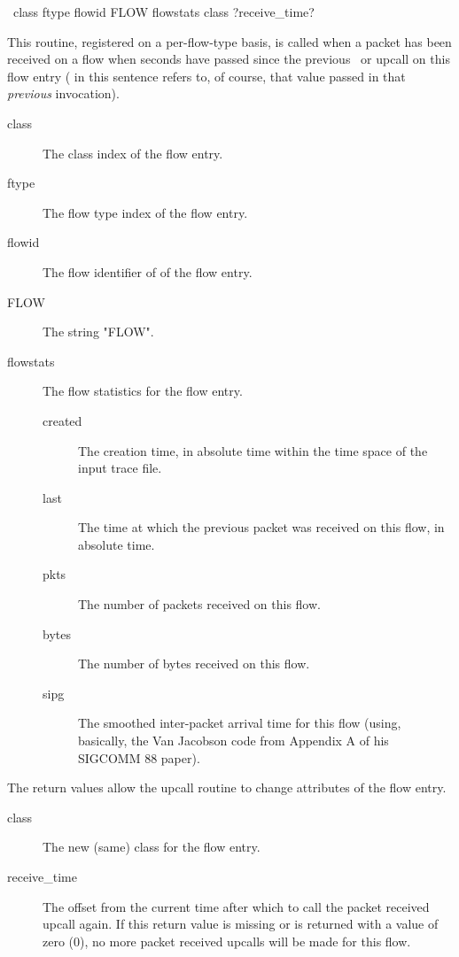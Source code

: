 \documentclass{article}
\begin{document}
\manend


\SYNOPSIS \cmdname\ class ftype flowid FLOW flowstats
\RETURNVALUES class ?receive\_time?

\DESCRIPTION

This routine, registered on a per-flow-type basis, is called when a
packet has been received on a flow when  seconds
have passed since the previous \cmdname\ or
 upcall on this flow entry
( in this sentence refers to, of course, that
value passed in that \emph{previous} invocation).

\begin{description}
\item[class] The class index of the flow entry.
\item[ftype] The flow type index of the flow entry.
\item[flowid] The flow identifier of of the flow entry.
\item[FLOW] The string "FLOW".
\item[flowstats] The flow statistics for the flow entry.
\begin{description}
\item[created] The creation time, in absolute time within the time
space of the input trace file.
\item[last] The time at which the previous packet was received on this
flow, in absolute time.
\item[pkts] The number of packets received on this flow.
\item[bytes] The number of bytes received on this flow.
\item[sipg] The smoothed inter-packet arrival time for this flow
(using, basically,
the Van Jacobson code from Appendix A of his SIGCOMM 88 paper).
\end{description}
\end{description}

The return values allow the upcall routine to change attributes of the
flow entry.

\begin{description}
\item[class]  The new (same) class for the flow entry.
\item[receive\_time] The offset from the current time after which to call
the packet received upcall again.  If this return value is missing or
is returned with a value of zero (0), no more packet received upcalls
will be made for this flow.
\end{description}
\end{document}
